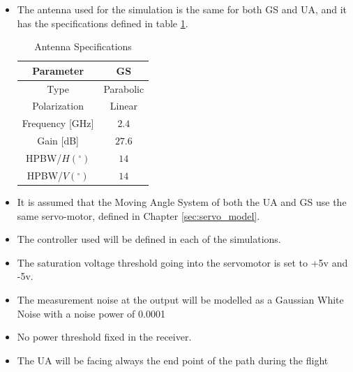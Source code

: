 \begin{itemize}
\item{The antenna used for the simulation is the same for both GS and UA, and it has the specifications defined in table \ref{table:2}.}
\begin{table}[h]
	\centering
	\begin{tabular}{|c||c|}
		\hline
		Parameter & GS\\ \hline\hline
		Type & Parabolic\\ \hline
		Polarization & Linear\\ \hline
		Frequency [GHz] & $2.4$\\ \hline
		Gain [dB] & $27.6$\\ \hline
		HPBW/$H(^{\circ})$ & $14$\\ \hline
		HPBW/$V(^{\circ})$ & $14$\\ \hline
	\end{tabular}
	\caption{Antenna Specifications}
	\label{table:2}
\end{table}
\item{It is assumed that the Moving Angle System of both the UA and GS use the same servo-motor, defined in Chapter \ref{sec:servo_model}.}
\item{The controller used will be defined in each of the simulations.}
\item{The saturation voltage threshold going into the servomotor is set to +5v and -5v.}
\item{The measurement noise at the output will be modelled as a Gaussian White Noise with a noise power of 0.0001}
\item{No power threshold fixed in the receiver.}
\item{The UA will be facing always the end point of the path during the flight}
\end{itemize}


